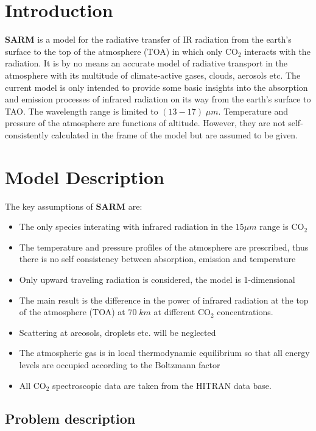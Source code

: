 \section{Introduction}

\textbf{SARM} is a model for the radiative transfer of IR radiation from the earth's surface to the  top of the atmosphere (TOA) in which only $\mathrm{CO}_2$ interacts with the radiation. It is by no means an accurate model of radiative transport in the atmosphere with its multitude of climate-active gases, clouds, aerosols etc. The current model is only intended to provide some basic insights into the absorption and emission processes of infrared radiation on its way from the earth's surface to TAO. The wavelength range is limited to $(13 - 17)\; \mu m$. Temperature and pressure of the atmosphere are functions of altitude. However, they are not self-consistently calculated in the frame of the model but are assumed to be given.
\section{Model Description}

The key assumptions of \textbf{SARM} are:
\begin{itemize}
	\item The only species interating with infrared radiation in the $15 \mu m$ range is $\mathrm{CO}_2$
	\item The temperature and pressure profiles of the atmosphere are prescribed, thus there is no self consistency between absorption, emission and temperature
	\item Only upward traveling radiation is considered, the model is 1-dimensional
	\item The main result is the difference in the power of infrared radiation at the top of the atmosphere (TOA) at $70 \;km$ at different $\mathrm{CO}_2$ concentrations.
	\item Scattering at areosols, droplets etc. will be neglected
	\item The atmospheric gas is in local thermodynamic equilibrium so that all energy levels are occupied according to the Boltzmann factor
	\item All $\mathrm{CO}_2$  spectroscopic data are taken from the HITRAN data base.
\end{itemize}

\subsection{Problem description}

